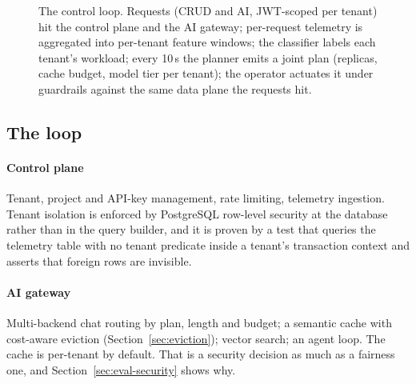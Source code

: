 \begin{figure}[htbp]
{%
}
\caption{The \polyforge{} control loop. Requests (CRUD and AI, JWT-scoped
per tenant) hit the control plane and the AI gateway; per-request telemetry
is aggregated into per-tenant feature windows; the classifier labels each
tenant's workload; every 10\,s the \jcac{} planner emits a joint plan
(replicas, cache budget, model tier per tenant); the operator actuates it
under guardrails against the same data plane the requests hit.}
\label{fig:architecture}
\end{figure}

\subsection{The loop}
\label{sec:design-loop}

\paragraph{Control plane} Tenant, project and API-key management, rate
limiting, telemetry ingestion. Tenant isolation is enforced by PostgreSQL
row-level security at the database rather than in the query builder, and
it is proven by a test that queries the telemetry table with no tenant
predicate inside a tenant's transaction context and asserts that foreign
rows are invisible.

\paragraph{AI gateway} Multi-backend chat routing by plan, length and
budget; a semantic cache with cost-aware eviction
(Section~\ref{sec:eviction}); vector search; an agent loop. The cache is
per-tenant by default. That is a security decision as much as a fairness
one, and Section~\ref{sec:eval-security} shows why.

